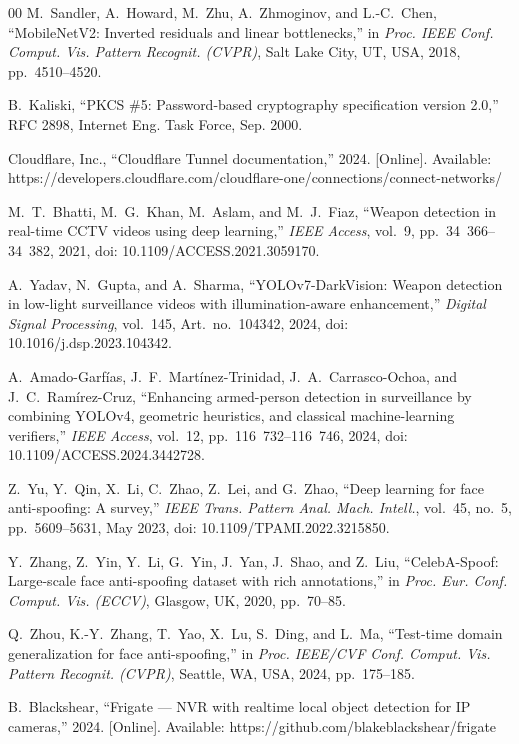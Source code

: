 \documentclass{ieeeaccess}
\begin{document}
\begin{thebibliography}{00}
 M.~Sandler, A.~Howard, M.~Zhu, A.~Zhmoginov, and L.-C.~Chen, ``MobileNetV2: Inverted residuals and linear bottlenecks,'' in \emph{Proc. IEEE Conf. Comput. Vis. Pattern Recognit. (CVPR)}, Salt Lake City, UT, USA, 2018, pp.~4510--4520.

 B.~Kaliski, ``PKCS \#5: Password-based cryptography specification version 2.0,'' RFC 2898, Internet Eng. Task Force, Sep. 2000.

 Cloudflare, Inc., ``Cloudflare Tunnel documentation,'' 2024. [Online]. Available: https://developers.cloudflare.com/cloudflare-one/connections/connect-networks/

 M.~T.~Bhatti, M.~G.~Khan, M.~Aslam, and M.~J.~Fiaz, ``Weapon detection in real-time CCTV videos using deep learning,'' \emph{IEEE Access}, vol.~9, pp.~34~366--34~382, 2021, doi: 10.1109/ACCESS.2021.3059170.

 A.~Yadav, N.~Gupta, and A.~Sharma, ``YOLOv7-DarkVision: Weapon detection in low-light surveillance videos with illumination-aware enhancement,'' \emph{Digital Signal Processing}, vol.~145, Art.~no.~104342, 2024, doi: 10.1016/j.dsp.2023.104342.

 A.~Amado-Garf\'{i}as, J.~F.~Mart\'{i}nez-Trinidad, J.~A.~Carrasco-Ochoa, and J.~C.~Ram\'{i}rez-Cruz, ``Enhancing armed-person detection in surveillance by combining YOLOv4, geometric heuristics, and classical machine-learning verifiers,'' \emph{IEEE Access}, vol.~12, pp.~116~732--116~746, 2024, doi: 10.1109/ACCESS.2024.3442728.

 Z.~Yu, Y.~Qin, X.~Li, C.~Zhao, Z.~Lei, and G.~Zhao, ``Deep learning for face anti-spoofing: A survey,'' \emph{IEEE Trans. Pattern Anal. Mach. Intell.}, vol.~45, no.~5, pp.~5609--5631, May 2023, doi: 10.1109/TPAMI.2022.3215850.

 Y.~Zhang, Z.~Yin, Y.~Li, G.~Yin, J.~Yan, J.~Shao, and Z.~Liu, ``CelebA-Spoof: Large-scale face anti-spoofing dataset with rich annotations,'' in \emph{Proc. Eur. Conf. Comput. Vis. (ECCV)}, Glasgow, UK, 2020, pp.~70--85.

 Q.~Zhou, K.-Y.~Zhang, T.~Yao, X.~Lu, S.~Ding, and L.~Ma, ``Test-time domain generalization for face anti-spoofing,'' in \emph{Proc. IEEE/CVF Conf. Comput. Vis. Pattern Recognit. (CVPR)}, Seattle, WA, USA, 2024, pp.~175--185.

 B.~Blackshear, ``Frigate --- NVR with realtime local object detection for IP cameras,'' 2024. [Online]. Available: https://github.com/blakeblackshear/frigate


\end{thebibliography}
\end{document}

